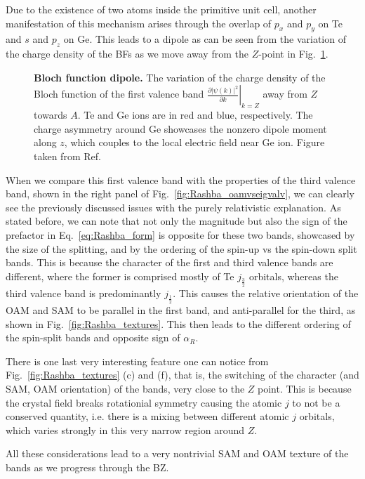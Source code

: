 Due to the existence of two atoms inside the primitive unit cell, another manifestation of this mechanism arises through the overlap of $p_x$ and $p_y$ on Te and $s$ and $p_z$ on Ge.
This leads to a dipole as can be seen from the variation of the charge density of the BFs as we move away from the $Z$-point in Fig.~\ref{fig:Rashba_diffdens}.
\begin{figure}[h]
\caption{\label{fig:Rashba_diffdens}{\bf Bloch function dipole.} The variation of the charge density of the Bloch function of the first valence band $\left.\frac{\partial |\psi(k)|^2}{\partial k}\right\rvert_{k=Z}$ away from $Z$ towards $A$. Te and Ge ions are in red and blue, respectively. The charge asymmetry around Ge showcases the nonzero dipole moment along $z$, which couples to the local electric field near Ge ion. Figure taken from Ref.~\cite{Ponet2018}}
\end{figure}

When we compare this first valence band with the properties of the third valence band, shown in the right panel of Fig.~\ref{fig:Rashba_oamvseigvalv}, we can clearly see the previously discussed issues with the purely relativistic explanation.
As stated before, we can note that not only the magnitude but also the sign of the prefactor in Eq.~\ref{eq:Rashba_form} is opposite for these two bands, showcased by the size of the splitting, and by the ordering of the spin-up vs the spin-down split bands.
This is because the character of the first and third valence bands are different, where the former is comprised mostly of Te $j_{\frac{3}{2}}$ orbitals, whereas the third valence band is predominantly $j_{\frac{1}{2}}$.
This causes the relative orientation of the OAM and SAM to be parallel in the first band, and anti-parallel for the third, as shown in Fig.~\ref{fig:Rashba_textures}.
This then leads to the different ordering of the spin-split bands and opposite sign of $\alpha_R$.

There is one last very interesting feature one can notice from Fig.~\ref{fig:Rashba_textures} (c) and (f), that is, the switching of the character (and SAM, OAM orientation) of the bands, very close to the $Z$ point.
This is because the crystal field breaks rotationial symmetry causing the atomic $j$ to not be a conserved quantity, i.e. there is a mixing between different atomic $j$ orbitals, which varies strongly in this very narrow region around $Z$.

All these considerations lead to a very nontrivial SAM and OAM texture of the bands as we progress through the BZ.


